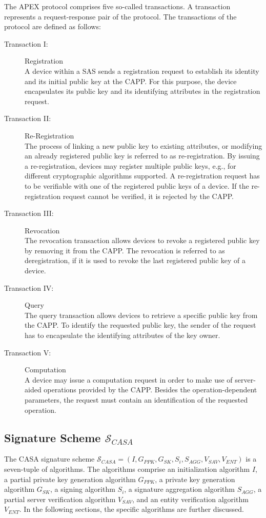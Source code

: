 The APEX protocol comprises five so-called transactions.
A transaction represents a request-response pair of the protocol.
The transactions of the protocol are defined as follows:
\begin{description}
    \item[Transaction I:] Registration\\
    A device within a SAS sends a registration request to establish its identity and its initial public key at the CAPP.
    For this purpose, the device encapsulates its public key and its identifying attributes in the registration request.
    \item[Transaction II:] Re-Registration\\
    The process of linking a new public key to existing attributes, or modifying an already registered public key is referred to as re-registration. 
    By issuing a re-registration, devices may register multiple public keys, e.g., for different cryptographic algorithms supported.
    A re-registration request has to be verifiable with one of the registered public keys of a device.
    If the re-registration request cannot be verified, it is rejected by the CAPP.
    \item[Transaction III:] Revocation\\
    The revocation transaction allows devices to revoke a registered public key by removing it from the CAPP.
    The revocation is referred to as deregistration, if it is used to revoke the last registered public key of a device.
    \item[Transaction IV:] Query\\
    The query transaction allows devices to retrieve a specific public key from the CAPP.
    To identify the requested public key, the sender of the request has to encapsulate the identifying attributes of the key owner.
    \item[Transaction V:] Computation\\
    A device may issue a computation request in order to make use of server-aided operations provided by the CAPP.
    Besides the operation-dependent parameters, the request must contain an identification of the requested operation.
\end{description}

\subsection{Signature Scheme $\mathcal{S}_{CASA}$}
\label{sec:casa:scheme}
The CASA signature scheme $\mathcal{S}_{CASA} = (I, G_{PPK}, G_{SK}, S_i, S_{AGG}, V_{SAV}, V_{ENT})$ is a seven-tuple of algorithms.
The algorithms comprise an initialization algorithm $I$, a partial private key generation algorithm $G_{PPK}$, a private key generation algorithm $G_{SK}$, a signing algorithm $S_i$, a signature aggregation algorithm $S_{AGG}$, a partial server verification algorithm $V_{SAV}$, and an entity verification algorithm $V_{ENT}$.
In the following sections, the specific algorithms are further discussed.

